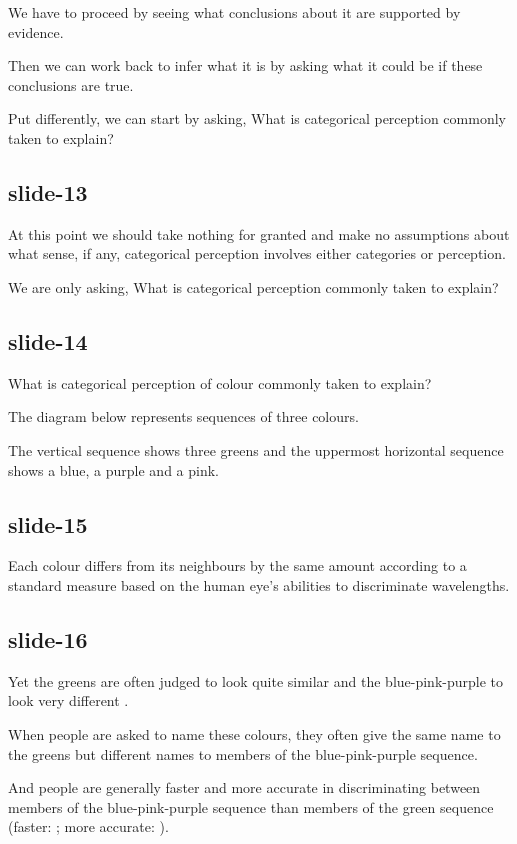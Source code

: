\documentclass[12pt,\papersize]{extarticle}
\begin{document}
We have to proceed by seeing what conclusions about it are supported by evidence.
 
Then we can work back to infer what it is by asking what it could be if these conclusions are true.
 
Put differently, we can start by asking, What is categorical perception commonly taken to explain?
 
\subsection{slide-13}
At this point we should take nothing for granted and make no assumptions about what sense, if any, categorical perception involves either categories or perception.
 
We  are only asking, What is categorical perception commonly taken to explain?
 
\subsection{slide-14}
What is categorical perception of colour commonly taken to explain?
 
The diagram below represents sequences of three colours.
 
The vertical sequence shows three greens and the uppermost horizontal sequence shows a blue, a purple and a pink.
 
\subsection{slide-15}
Each colour differs from its neighbours by the same amount according to a standard measure based on the human eye's abilities to discriminate wavelengths.
 
\subsection{slide-16}
Yet the greens are often judged to look quite similar and the blue-pink-purple to look very different \citep[p.\ 12--7]{Roberson:1999rk}.
 
When people are asked to name these colours, they often give the same name to the greens but different names to members of the blue-pink-purple sequence.
 
And people are generally faster and more accurate in discriminating between members of the blue-pink-purple sequence than members of the green sequence (faster: \citealp{Bornstein:1984cb}; more accurate: \citealp[p.\ 22--7]{Roberson:1999rk}).
 
\end{document}
